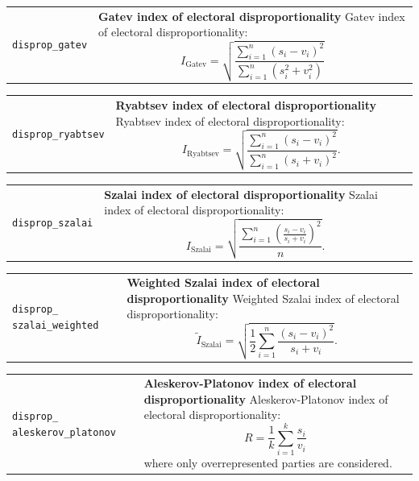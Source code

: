 \documentclass[
  a4paper,
  DIV=11,
  numbers=noendperiod]{scrartcl}
\begin{document}
\begin{longtable*}{p{3.2cm}| p{11cm}}
\texttt{disprop\_gatev} &\textbf{Gatev index of electoral disproportionality}\newline 
Gatev index of electoral disproportionality:
           \begin{equation}I_{\text{Gatev}} = \sqrt{\frac{\sum_{i=1}^{n}\left(s_i - v_i\right)^2}{\sum_{i=1}^{n}\left(s_i^2 + v_i^2\right)}}\end{equation}
\end{longtable*}

\begin{longtable*}{p{3.2cm}| p{11cm}}
\texttt{disprop\_ryabtsev} &\textbf{Ryabtsev  index of electoral disproportionality}\newline 
Ryabtsev  index of electoral disproportionality:
           \begin{equation}I_{\text{Ryabtsev}} = \sqrt{\frac{\sum_{i=1}^{n}\left(s_i - v_i\right)^2}{\sum_{i=1}^{n}\left(s_i + v_i\right)^2}}.\end{equation}
\end{longtable*}

\begin{longtable*}{p{3.2cm}| p{11cm}}
\texttt{disprop\_szalai} &\textbf{Szalai index of electoral disproportionality}\newline 
Szalai index of electoral disproportionality:
           \begin{equation}I_{\text{Szalai}} = \sqrt{\frac{\sum_{i=1}^{n}\left(\frac{s_i-v_i}{s_i+v_i}\right)^2}{n}}.\end{equation}
\end{longtable*}

\begin{longtable*}{p{3.2cm}| p{11cm}}
\texttt{disprop\_
szalai\_weighted} &\textbf{Weighted Szalai index of electoral disproportionality}\newline 
Weighted Szalai index of electoral disproportionality:
           \begin{equation}\tilde{I}_{\text{Szalai}} = \sqrt{\frac{1}{2}\sum_{i=1}^{n}\frac{\left(s_i-v_i\right)^2}{s_i+v_i}}.\end{equation}
\end{longtable*}

\begin{longtable*}{p{3.2cm}| p{11cm}}
\texttt{disprop\_
aleskerov\_platonov} &\textbf{Aleskerov-Platonov index of electoral disproportionality}\newline 
Aleskerov-Platonov index of electoral disproportionality:
           \begin{equation}R = \frac{1}{k}\sum_{i=1}^{k}\frac{s_i}{v_i}\end{equation}
           where only overrepresented parties are considered.
\end{longtable*}
\end{document}

